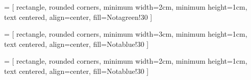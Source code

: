 \newcommand{\distance}{5cm}

 = [
    rectangle, rounded corners, 
    minimum width=2cm, 
    minimum height=1cm,
    text centered,  
    align=center,
    fill=Notagreen!30
]

 = [
    rectangle, rounded corners, 
    minimum width=3cm, 
    minimum height=1cm,
    text centered,  
    align=center,
    fill=Notablue!30
]

 = [
    rectangle, rounded corners, 
    minimum width=2cm, 
    minimum height=1cm,
    text centered,  
    align=center,
    fill=Notablue!30
]

